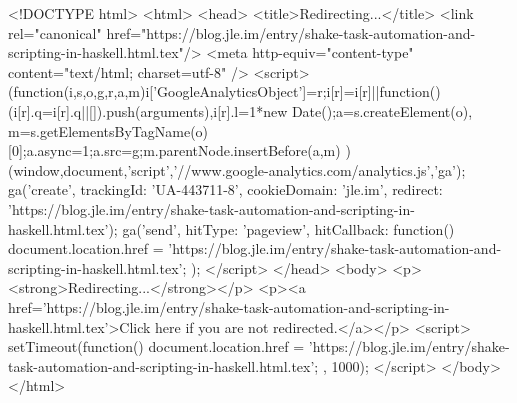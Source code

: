<!DOCTYPE html>
<html>
<head>
<title>Redirecting...</title>
<link rel="canonical" href="https://blog.jle.im/entry/shake-task-automation-and-scripting-in-haskell.html.tex"/>
<meta http-equiv="content-type" content="text/html; charset=utf-8" />
<script>
(function(i,s,o,g,r,a,m){i['GoogleAnalyticsObject']=r;i[r]=i[r]||function(){
(i[r].q=i[r].q||[]).push(arguments)},i[r].l=1*new Date();a=s.createElement(o),
m=s.getElementsByTagName(o)[0];a.async=1;a.src=g;m.parentNode.insertBefore(a,m)
})(window,document,'script','//www.google-analytics.com/analytics.js','ga');
ga('create', { trackingId: 'UA-443711-8', cookieDomain: 'jle.im', redirect: 'https://blog.jle.im/entry/shake-task-automation-and-scripting-in-haskell.html.tex'});
ga('send', { hitType: 'pageview', hitCallback: function() { document.location.href = 'https://blog.jle.im/entry/shake-task-automation-and-scripting-in-haskell.html.tex'; } });
</script>
</head>
<body>
  <p><strong>Redirecting...</strong></p>
  <p><a href='https://blog.jle.im/entry/shake-task-automation-and-scripting-in-haskell.html.tex'>Click here if you are not redirected.</a></p>
  <script>
    setTimeout(function() { document.location.href = 'https://blog.jle.im/entry/shake-task-automation-and-scripting-in-haskell.html.tex'; }, 1000);
  </script>
</body>
</html>
